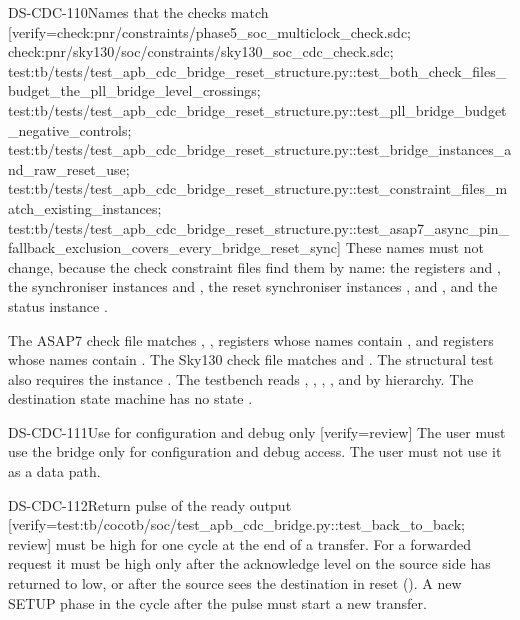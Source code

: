 \begin{requirement}{DS-CDC-110}{Names that the checks match}
[verify={check:pnr/constraints/phase5_soc_multiclock_check.sdc; check:pnr/sky130/soc/constraints/sky130_soc_cdc_check.sdc; test:tb/tests/test_apb_cdc_bridge_reset_structure.py::test_both_check_files_budget_the_pll_bridge_level_crossings; test:tb/tests/test_apb_cdc_bridge_reset_structure.py::test_pll_bridge_budget_negative_controls; test:tb/tests/test_apb_cdc_bridge_reset_structure.py::test_bridge_instances_and_raw_reset_use; test:tb/tests/test_apb_cdc_bridge_reset_structure.py::test_constraint_files_match_existing_instances; test:tb/tests/test_apb_cdc_bridge_reset_structure.py::test_asap7_async_pin_fallback_exclusion_covers_every_bridge_reset_sync}]
These names must not change, because the check constraint files find them by name: the registers  and , the synchroniser instances  and , the reset synchroniser instances ,  and , and the status instance .
\end{requirement}
\begin{information}
The ASAP7 check file matches , , registers whose names contain , and registers whose names contain . The Sky130 check file matches  and . The structural test  also requires the instance . The testbench reads , , , ,  and  by hierarchy. The destination state machine has no state .
\end{information}

\begin{requirement}{DS-CDC-111}{Use for configuration and debug only}
[verify={review}]
The user must use the bridge only for configuration and debug access. The user must not use it as a data path.
\end{requirement}

\begin{requirement}{DS-CDC-112}{Return pulse of the ready output}
[verify={test:tb/cocotb/soc/test_apb_cdc_bridge.py::test_back_to_back; review}]
 must be high for one  cycle at the end of a transfer. For a forwarded request it must be high only after the acknowledge level on the source side has returned to low, or after the source sees the destination in reset (). A new SETUP phase in the cycle after the pulse must start a new transfer.
\end{requirement}

